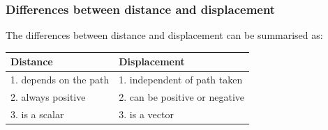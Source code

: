             \subsubsection*{Differences between distance and displacement}
            \nopagebreak
        \label{m38788*id63938}The differences between distance and displacement can be summarised as:\par 
\begin{center}
\begin{tabular}{|l|l|}\hline
\textbf{ Distance } & \textbf{ Displacement } \\\hline
1. depends on the path & 1. independent of path taken \\\hline
2. always positive & 2. can be positive or negative \\\hline
3. is a scalar & 3. is a vector\\\hline
\end{tabular}
\end{center}
    \par
\label{m38788*secfhsst!!!underscore!!!id498}
